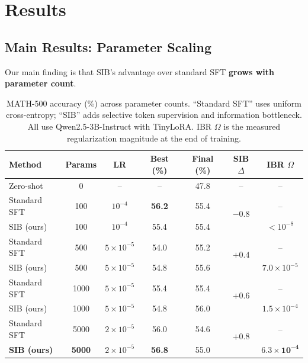 \documentclass{article}
\begin{document}
\section{Results}
\label{sec:results}

\subsection{Main Results: Parameter Scaling}

Our main finding is that SIB's advantage over standard SFT \textbf{grows with parameter count}.

\begin{table}[t]
\centering
\caption{MATH-500 accuracy (\%) across parameter counts. ``Standard SFT'' uses uniform cross-entropy; ``SIB'' adds selective token supervision and information bottleneck. All use Qwen2.5-3B-Instruct with TinyLoRA. IBR $\Omega$ is the measured regularization magnitude at the end of training.}
\label{tab:main}
\begin{tabular}{lcccccc}
\toprule
\textbf{Method} & \textbf{Params} & \textbf{LR} & \textbf{Best (\%)} & \textbf{Final (\%)} & \textbf{SIB $\Delta$} & \textbf{IBR $\Omega$} \\
\midrule
Zero-shot & 0 & -- & -- & 47.8 & -- & -- \\
\midrule
Standard SFT & 100 & $10^{-4}$ & \textbf{56.2} & 55.4 & \multirow{2}{*}{$-0.8$} & -- \\
SIB (ours)   & 100 & $10^{-4}$ & 55.4 & 55.4 & & $<10^{-8}$ \\
\midrule
Standard SFT & 500 & $5{\times}10^{-5}$ & 54.0 & 55.2 & \multirow{2}{*}{$+0.4$} & -- \\
SIB (ours)   & 500 & $5{\times}10^{-5}$ & 54.8 & 55.6 & & $7.0{\times}10^{-5}$ \\
\midrule
Standard SFT & 1000 & $5{\times}10^{-5}$ & 55.4 & 55.4 & \multirow{2}{*}{$+0.6$} & -- \\
SIB (ours) & 1000 & $5{\times}10^{-5}$ & 54.8 & 56.0 & & $1.5{\times}10^{-4}$ \\
\midrule
Standard SFT & 5000 & $2{\times}10^{-5}$ & 56.0 & 54.6 & \multirow{2}{*}{$\mathbf{+0.8}$} & -- \\
\textbf{SIB (ours)} & \textbf{5000} & $2{\times}10^{-5}$ & \textbf{56.8} & 55.0 & & $\mathbf{6.3{\times}10^{-4}}$ \\
\bottomrule
\end{tabular}
\end{table}
\end{document}
